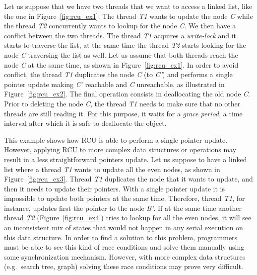 \begin{refsection}
Let us suppose that we have two threads that we want to access a linked list,
like the one in Figure~\ref{fig:rcu_ex1}.
%
The thread \emph{T1} wants to update the node \emph{C} while the thread
\emph{T2} concurrently wants to lookup for the node \emph{C}.
%
We then have a conflict between the two threads.
%
The thread \emph{T1} acquires a \emph{write-lock} and it starts to traverse
the list, at the same time the thread \emph{T2} starts looking for the node
\emph{C} traversing the list as well.
%
Let us assume that both threads reach the node \emph{C} at the same time, as
shown in Figure~\ref{fig:rcu_ex1}.
%
In order to avoid conflict, the thread \emph{T1} duplicates the node \emph{C}
(to \emph{C'}) and performs a single pointer update making \emph{C'} reachable
and \emph{C} unreachable, as illustrated in Figure~\ref{fig:rcu_ex2}.
%
The final operation consists in deallocating the old node \emph{C}.
%
Prior to deleting the node \emph{C}, the thread \emph{T1} needs to make sure
that no other threads are still reading it.
%
For this purpose, it waits for a \emph{grace period}, a time interval after
which it is safe to deallocate the object.

This example shows how RCU is able to perform a single pointer update.
%
However, applying RCU to more complex data structures or operations may result
in a less straightforward pointers update.
%
Let us suppose to have a linked list where a thread \emph{T1} wants to update
all the even nodes, as shown in Figure~\ref{fig:rcu_ex3}.
%
Thread \emph{T1} duplicates the node that it wants to update, and then it
needs to update their pointers.
%
With a single pointer update it is impossible to update both pointers at the
same time.
%
Therefore, thread \emph{T1}, for instance, updates first the pointer to the
node \emph{B'}.
%
If at the same time another thread \emph{T2} (Figure~\ref{fig:rcu_ex4}) tries
to lookup for all the even nodes, it will see an inconsistent mix of states
that would not happen in any serial execution on this data structure.
%
In order to find a solution to this problem, programmers must be able to see
this kind of race conditions and solve them manually using some
synchronization mechanism.
%
However, with more complex data structures (e.g.\ search tree, graph) solving
these race conditions may prove very difficult.


\end{refsection}
